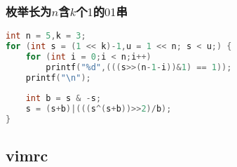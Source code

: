 	\subsubsection{枚举长为$n$含$k$个$1$的$01$串}
	\begin{lstlisting}[language=c++]
int n = 5,k = 3;
for (int s = (1 << k)-1,u = 1 << n; s < u;) {
	for (int i = 0;i < n;i++)
		printf("%d",(((s>>(n-1-i))&1) == 1));
	printf("\n");
	
	int b = s & -s;
	s = (s+b)|(((s^(s+b))>>2)/b);
}
	\end{lstlisting}

\subsection{vimrc}

